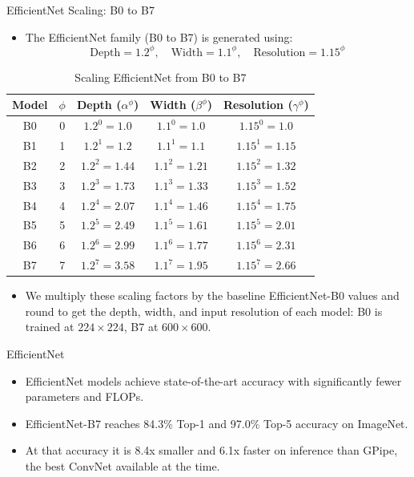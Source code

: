 \begin{frame}{EfficientNet Scaling: B0 to B7}
    \begin{itemize}
        \item The EfficientNet family (B0 to B7) is generated using:
        \[
        \text{Depth} = 1.2^\phi, \quad
        \text{Width} = 1.1^\phi, \quad
        \text{Resolution} = 1.15^\phi
        \]
    \end{itemize}

    \begin{table}[]
        \centering
        \small
        \begin{tabular}{|c|c|c|c|c|}
            \hline
            \textbf{Model} & \(\phi\) & \textbf{Depth} (\(\alpha^\phi\)) & \textbf{Width} (\(\beta^\phi\)) & \textbf{Resolution} (\(\gamma^\phi\)) \\
            \hline
            B0 & 0 & \(1.2^0 = 1.0\) & \(1.1^0 = 1.0\) & \(1.15^0 = 1.0\) \\
            B1 & 1 & \(1.2^1 = 1.2\) & \(1.1^1 = 1.1\) & \(1.15^1 = 1.15\) \\
            B2 & 2 & \(1.2^2 = 1.44\) & \(1.1^2 = 1.21\) & \(1.15^2 = 1.32\) \\
            B3 & 3 & \(1.2^3 = 1.73\) & \(1.1^3 = 1.33\) & \(1.15^3 = 1.52\) \\
            B4 & 4 & \(1.2^4 = 2.07\) & \(1.1^4 = 1.46\) & \(1.15^4 = 1.75\) \\
            B5 & 5 & \(1.2^5 = 2.49\) & \(1.1^5 = 1.61\) & \(1.15^5 = 2.01\) \\
            B6 & 6 & \(1.2^6 = 2.99\) & \(1.1^6 = 1.77\) & \(1.15^6 = 2.31\) \\
            B7 & 7 & \(1.2^7 = 3.58\) & \(1.1^7 = 1.95\) & \(1.15^7 = 2.66\) \\
            \hline
        \end{tabular}
        \caption*{Scaling EfficientNet from B0 to B7}
    \end{table}

    \begin{itemize}
        \item We multiply these scaling factors by the baseline EfficientNet-B0 values and round to get the depth, width, and input resolution of each model: B0 is trained at $224\times224$, B7 at $600\times600$.
    \end{itemize}
\end{frame}


\begin{frame}{EfficientNet}
    \begin{itemize}
        \item EfficientNet models achieve state-of-the-art accuracy with significantly fewer parameters and FLOPs.        
        \pause
        \item EfficientNet-B7 reaches 84.3\% Top-1 and 97.0\% Top-5 accuracy on ImageNet.
        \pause
        \item At that accuracy it is 8.4x smaller and 6.1x faster on inference than GPipe, the best ConvNet available at the time.
    \end{itemize}
\end{frame}


